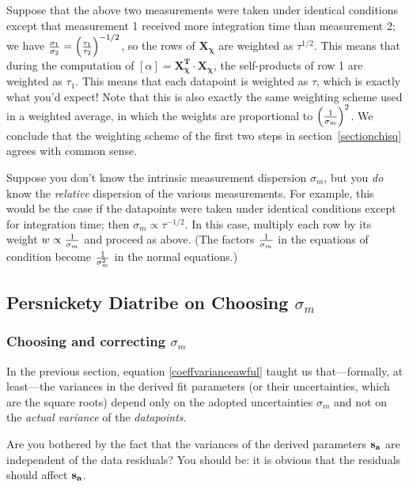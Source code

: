 \documentclass[psfig,preprint]{aastex}
\begin{document}
	Suppose that the above two measurements were taken under
identical conditions except that measurement 1 received more integration
time than measurement 2; we have ${\sigma_{1} \over \sigma_{2}} =
\left({\tau_1 \over \tau_2}\right)^{-1/2}$, so the rows of $\mathbf
{X_\chi}$ are weighted as $\tau^{1/2}$.  This means that during the
computation of $[\alpha] = \mathbf {X_\chi^T \cdot X_\chi}$, the
self-products of row 1 are weighted as $\tau_1$.  This means that each
datapoint is weighted as $\tau$, which is exactly what you'd expect!
Note that this is also exactly the same weighting scheme used in a
weighted average, in which the weights are proportional to $\left(1
\over \sigma_{m}\right)^2$.  We conclude that the weighting scheme of
the first two steps in section~\ref{sectionchisq} agrees with common
sense. 

	Suppose you don't know the intrinsic measurement dispersion
$\sigma_{m}$, but you {\it do} know the {\it relative} dispersion of
the various measurements.  For example, this would be the case if the
datapoints were taken under identical conditions except for integration
time; then $\sigma_{m} \propto \tau^{-1/2}$.  In this case, multiply
each row by its weight $w \propto {1 \over \sigma_{m}}$ and proceed
as above. (The factors ${1 \over \sigma_{m}}$ in the equations of
condition become ${1 \over \sigma_{m}^2}$ in the normal equations.)

\subsection{ Persnickety Diatribe on Choosing $\sigma_{m}$ }
\label{diatribe} 

\subsubsection{Choosing and correcting $\sigma_{m}$}

\label{diatrabeone}

	In the previous section, equation \ref{coeffvarianceawful}
taught us that---formally, at least---the variances in the derived fit
parameters (or their uncertainties, which are the square roots) depend
only on the adopted uncertainties $\sigma_{m}$ and not on the {\it
actual variance} of the {\it datapoints}. 

	Are you bothered by the fact that the variances of the derived
parameters ${\bf s_a}$ are independent of the data residuals? You should be:
it is obvious that the residuals should affect ${\bf s_a}$. 
\end{document}
